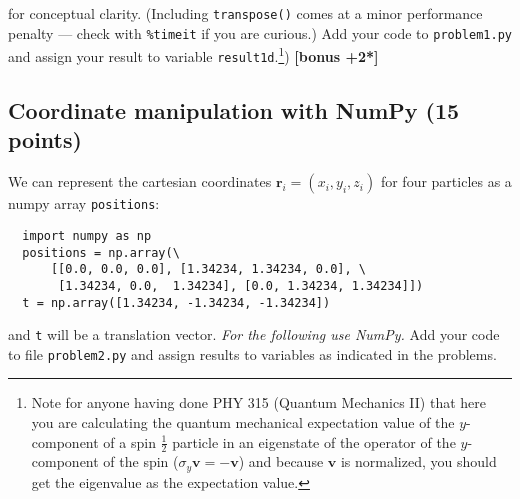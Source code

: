 \documentclass[letterpaper]{scrartcl}
\newcounter{TotalBonus}
\newcommand{\bonus}[1]{\textbf{[bonus +#1*]}\stepcounter{TotalBonus}}
\newenvironment{enuma}{\begin{enumerate}[label=(\alph*)]}{\end{enumerate}}
\renewcommand{\vec}[1]{\ensuremath{\mathbf{#1}}}
\begin{document}
\begin{enuma}
{    for conceptual clarity. (Including \texttt{transpose()} comes at a
    minor performance penalty --- check with \texttt{\%timeit} if you
    are curious.)}  Add your code to \texttt{problem1.py} and assign
  your result to variable \texttt{result1d}.\footnote{Note for anyone
    having done PHY 315 (Quantum Mechanics II) that here you are
    calculating the quantum mechanical expectation value of the
    $y$-component of a spin $\frac{1}{2}$ particle in an eigenstate of
    the operator of the $y$-component of the spin
    ($\sigma_{y}\vec{v} = -\vec{v}$) and because $\vec{v}$ is
    normalized, you should get the eigenvalue as the expectation
    value.})  \bonus{2}
\end{enuma}


\subsection{Coordinate manipulation with NumPy (15 points)}
We can represent the cartesian coordinates
$\vec{r}_{i} = (x_{i}, y_{i}, z_{i})$ for four particles as a numpy array
\texttt{positions}:
\begin{verbatim}
  import numpy as np
  positions = np.array(\
      [[0.0, 0.0, 0.0], [1.34234, 1.34234, 0.0], \
       [1.34234, 0.0,  1.34234], [0.0, 1.34234, 1.34234]])
  t = np.array([1.34234, -1.34234, -1.34234])
\end{verbatim}
and \texttt{t} will be a translation vector.
\emph{For the following use NumPy.} Add your code to file
\texttt{problem2.py} and assign results to variables as indicated in
the problems.
\end{document}
